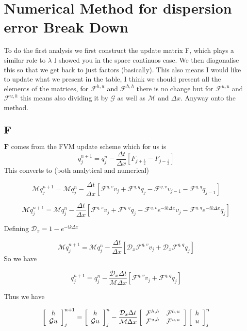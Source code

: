 \documentclass[12pt]{article}
\begin{document}
\section{Numerical Method for dispersion error Break Down}
To do the first analysis we first construct the update matrix F, which plays a similar role to $\lambda$ I showed you in the space continuos case. We then diagonalise this so that we get back to just factors (basically). This also means I would like to update what we present in the table, I think we should present all the elements of the matrices, for $\mathcal{F}^{h,u}$ and $\mathcal{F}^{h,h}$ there is no change but for $\mathcal{F}^{u,u}$ and $\mathcal{F}^{u,h}$ this means also dividing it by $\mathcal{G}$ as well as $\mathcal{M}$ and $\Delta x$. Anyway onto the method.

\subsection{$\boldsymbol{F}$}
$\boldsymbol{F}$ comes from the FVM update scheme which for us is
\[\bar{q}_j^{n+1} = \bar{q}_j^{n} - \frac{\Delta t}{\Delta x} \left[F_{j + \frac{1}{2}} - F_{j - \frac{1}{2}} \right] \]
This converts to (both analytical and numerical)

\[\mathcal{M}q_j^{n+1} = \mathcal{M}q_j^{n} - \frac{\Delta t}{\Delta x} \left[\mathcal{F}^{q,v}v_{j} + \mathcal{F}^{q,q}q_{j} - \mathcal{F}^{q,v}v_{j-1} - \mathcal{F}^{q,q}q_{j-1} \right] \]

\[\mathcal{M}q_j^{n+1} = \mathcal{M}q_j^{n} - \frac{\Delta t}{\Delta x} \left[\mathcal{F}^{q,v}v_{j} + \mathcal{F}^{q,q}q_{j} - \mathcal{F}^{q,v}e^{-ik\Delta x}v_{j} - \mathcal{F}^{q,q}e^{-ik\Delta x}q_{j} \right] \]

Defining $\mathcal{D}_x = 1 - e^{-ik\Delta x} $

\[\mathcal{M}q_j^{n+1}  = \mathcal{M}q_j^{n}   - \frac{\Delta t}{\Delta x} \left[ \mathcal{D}_x\mathcal{F}^{q,v}v_{j} + \mathcal{D}_x\mathcal{F}^{q,q}q_{j}\right] \]
So we have

\[q_j^{n+1}  = q_j^{n}   - \frac{\mathcal{D}_x\Delta t}{\mathcal{M}\Delta x} \left[ \mathcal{F}^{q,v}v_{j} + \mathcal{F}^{q,q}q_{j}\right] \]

Thus we have

\[\left[\begin{array}{c}
h \\ \mathcal{G}u
\end{array}\right]^{n+1}_j = \left[\begin{array}{c}
h \\ \mathcal{G}u
\end{array}\right]^{n}_j - \frac{\mathcal{D}_x\Delta t}{\mathcal{M}\Delta x}\left[\begin{array}{c c}
\mathcal{F}^{h,h} & \mathcal{F}^{h,u} \\ \mathcal{F}^{u,h} & \mathcal{F}^{u,u} 
\end{array}\right]\left[\begin{array}{c}
h \\ u
\end{array}\right]^{n}_j  \]
\end{document}
